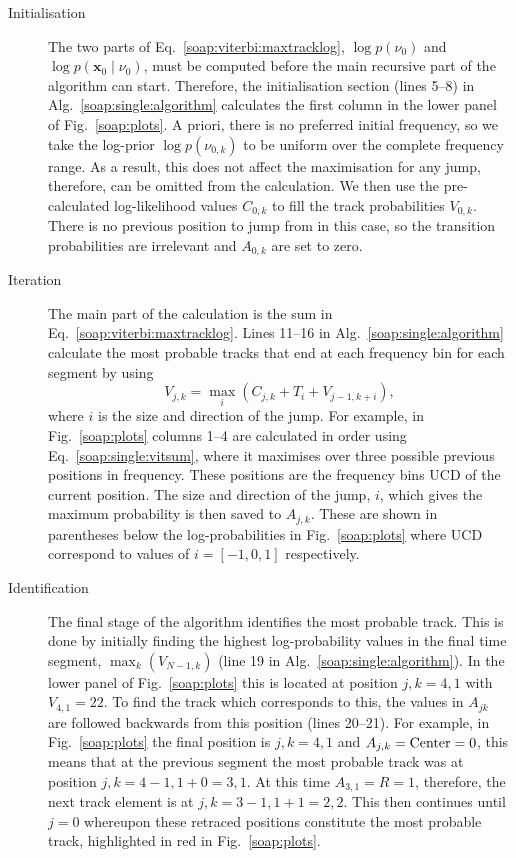 \begin{description}
%
%
\item[Initialisation] The two parts of Eq.~\ref{soap:viterbi:maxtracklog},  $\log p(\nu_0)$ and $\log p({\bm x_0} \mid \nu_0)$, must be computed before the main recursive part of the algorithm can start. Therefore, the initialisation section (lines 5--8) in Alg.~\ref{soap:single:algorithm} calculates the first column in the lower panel of Fig.~\ref{soap:plots}. A priori, there is no preferred initial frequency, so we take the log-prior $\log p(\nu_{0,k})$ to be uniform over the complete frequency range. As a result, this does not affect the maximisation for any jump, therefore, can be omitted from the calculation. We then use the pre-calculated log-likelihood values $C_{0,k}$ to fill the track probabilities $V_{0,k}$.  There is no previous position to jump from in this case, so the transition probabilities are irrelevant and $A_{0,k}$ are set to zero.
%
%
\item[Iteration] The main part of the calculation is the sum in Eq.~\ref{soap:viterbi:maxtracklog}. Lines 11--16 in Alg.~\ref{soap:single:algorithm} calculate the most probable tracks that end at each frequency bin for each segment by using
    \begin{equation} \label{soap:single:vitsum}
    V_{j,k} = \max_{i}({C_{j,k} }+ T_{i} + V_{j-1,k+i}),
    \end{equation}
    where $i$ is the size and direction of the jump. For example, in Fig.~\ref{soap:plots} columns 1--4 are calculated in order using Eq.~\ref{soap:single:vitsum}, where it maximises over three possible previous positions in frequency. These positions are the frequency bins \gls{UCD} of the current position. The size and direction of the jump, $i$, which gives the maximum probability is then saved to $A_{j,k}$. These are shown in parentheses below the log-probabilities in Fig.~\ref{soap:plots} where \gls{UCD} correspond to values of $i = [-1,0,1]$ respectively.
%
%
\item[Identification] The final stage of the algorithm identifies the most probable track. This is done by initially finding the highest log-probability values in the final time segment, $\max_k(V_{N-1,k})$ (line 19 in Alg.~\ref{soap:single:algorithm}). In the lower panel of Fig.~\ref{soap:plots} this is located at position $j,k = 4,1$ with $V_{4,1} = 22$. To find the track which corresponds to this, the values in $A_{jk}$ are followed backwards from this position (lines 20--21). For example, in Fig.~\ref{soap:plots} the final position is $j,k = 4,1$ and $A_{j,k} = \rm{Center} = 0$, this means that at the previous segment the most probable track was at position $j,k = 4-1,1+0 = 3,1$. At this time $A_{3,1} = R = 1$, therefore, the next track element is at $j,k = 3-1,1+1 = 2,2$. This then continues until $j=0$ whereupon these retraced positions constitute the most probable track, highlighted in red in Fig.~\ref{soap:plots}.
%
\end{description}

